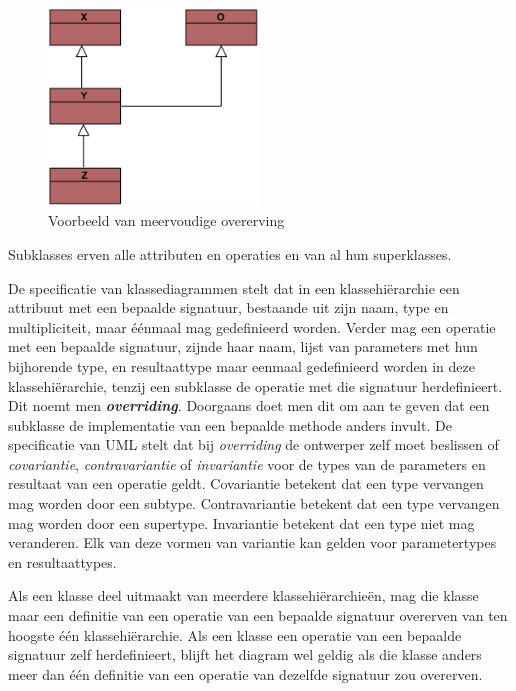 \begin{figure}
	\centering
	\includegraphics[width=0.5\textwidth]{chap-consistentie/voorbeeld6.png}
	\caption{Voorbeeld van meervoudige overerving}
	\label{fig:multi-inheritance}
\end{figure}

Subklasses erven alle attributen en operaties en van al hun superklasses.

De specificatie van klassediagrammen stelt dat in een klassehi\"erarchie een attribuut met een bepaalde signatuur, bestaande uit zijn naam, type en multipliciteit, maar \'e\'enmaal mag gedefinieerd worden. Verder mag een operatie met een bepaalde signatuur, zijnde haar naam, lijst van parameters met hun bijhorende type, en resultaattype maar eenmaal gedefinieerd worden in deze klassehi\"erarchie, tenzij een subklasse de operatie met die signatuur herdefinieert. Dit noemt men \textit{\textbf{overriding}}. Doorgaans doet men dit om aan te geven dat een subklasse de implementatie van een bepaalde methode anders invult. De specificatie van UML\cite{OMG-UML} stelt dat bij \textit{overriding} de ontwerper zelf moet beslissen of \textit{covariantie}, \textit{contravariantie} of \textit{invariantie} voor de types van de parameters en resultaat van een operatie geldt. Covariantie betekent dat een type vervangen mag worden door een subtype. Contravariantie betekent dat een type vervangen mag worden door een supertype. Invariantie betekent dat een type niet mag veranderen. Elk van deze vormen van variantie kan gelden voor parametertypes en resultaattypes.

Als een klasse deel uitmaakt van meerdere klassehi\"erarchie\"en, mag die klasse maar een definitie van een operatie van een bepaalde signatuur overerven van ten hoogste \'e\'en klassehi\"erarchie. Als een klasse een operatie van een bepaalde signatuur zelf herdefinieert, blijft het diagram wel geldig als die klasse anders meer dan \'e\'en definitie van een operatie van dezelfde signatuur zou overerven.

